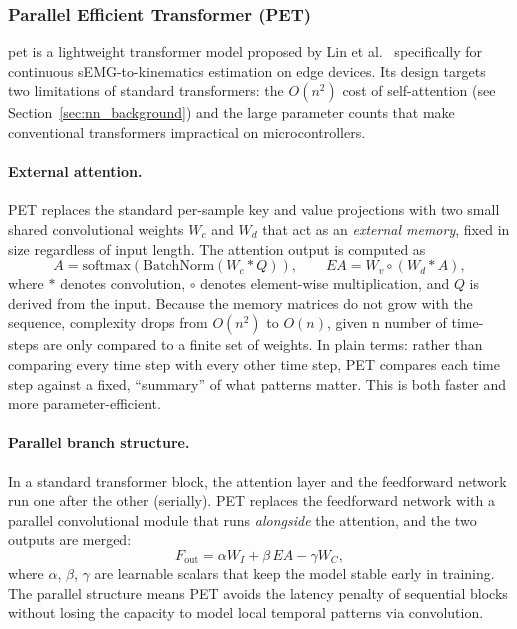 \documentclass[11pt]{article}
\begin{document}
\subsubsection{Parallel Efficient Transformer (PET)}
\label{sec:pet}
\gls{pet} is a lightweight transformer model proposed by Lin et al.\ \cite{lin2025pet} specifically for continuous sEMG-to-kinematics estimation on edge devices. Its design targets two limitations of standard transformers: the $O(n^2)$ cost of self-attention (see Section~\ref{sec:nn_background}) and the large parameter counts that make conventional transformers impractical on microcontrollers.

\paragraph{External attention.}
PET replaces the standard per-sample key and value projections with two small shared convolutional weights $W_c$ and $W_d$ that act as an \emph{external memory}, fixed in size regardless of input length. The attention output is computed as
\begin{equation}
A = \text{softmax}(\text{BatchNorm}(W_c * Q)), \qquad EA = W_v \circ (W_d * A),
\end{equation}
where $*$ denotes convolution, $\circ$ denotes element-wise multiplication, and $Q$ is derived from the input. Because the memory matrices do not grow with the sequence, complexity drops from $O(n^2)$ to $O(n)$, given n number of time-steps are only compared to a finite set of weights. In plain terms: rather than comparing every time step with every other time step, PET compares each time step against a fixed, ``summary'' of what patterns matter. This is both faster and more parameter-efficient.

\paragraph{Parallel branch structure.}
In a standard transformer block, the attention layer and the feedforward network run one after the other (serially). PET replaces the feedforward network with a parallel convolutional module that runs \emph{alongside} the attention, and the two outputs are merged:
\begin{equation}
F_{\text{out}} = \alpha W_I + \beta\, EA - \gamma W_C,
\end{equation}
where $\alpha$, $\beta$, $\gamma$ are learnable scalars that keep the model stable early in training. The parallel structure means PET avoids the latency penalty of sequential blocks without losing the capacity to model local temporal patterns via convolution.
\end{document}
